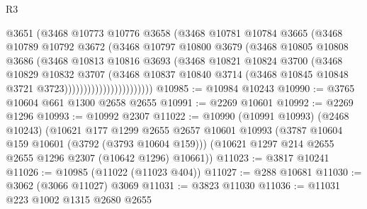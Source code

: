 \begin{lexlean}{R3}
\begin{coremodule}
                              @3651
                              (@3468
                                @10773
                                @10776
                                @3658
                                (@3468
                                  @10781
                                  @10784
                                  @3665
                                  (@3468
                                    @10789
                                    @10792
                                    @3672
                                    (@3468
                                      @10797
                                      @10800
                                      @3679
                                      (@3468
                                        @10805
                                        @10808
                                        @3686
                                        (@3468
                                          @10813
                                          @10816
                                          @3693
                                          (@3468
                                            @10821
                                            @10824
                                            @3700
                                            (@3468
                                              @10829
                                              @10832
                                              @3707
                                              (@3468
                                                @10837
                                                @10840
                                                @3714
                                                (@3468
                                                  @10845
                                                  @10848
                                                  @3721
                                                  @3723)))))))))))))))))))))))
@10985 := @10984 @10243
@10990 := @3765 @10604 @661 @1300 @2658 @2655
@10991 := @2269 @10601
@10992 := @2269 @1296
@10993 := @10992 @2307
@11022 := @10990
    (@10991 @10993)
    (@2468 @10243)
    (@10621
      @177
      @1299
      @2655
      @2657
      @10601
      @10993
      (@3787 @10604 @159 @10601 (@3792 (@3793 @10604 @159)))
      (@10621 @1297 @214 @2655 @2655 @1296 @2307 (@10642 @1296) @10661))
@11023 := @3817 @10241
@11026 := @10985 (@11022 (@11023 @404))
@11027 := @288 @10681
@11030 := @3062 (@3066 @11027) @3069
@11031 := @3823 @11030
@11036 := @11031 @223 @1002 @1315 @2680 @2655

\end{coremodule}
\end{lexlean}
